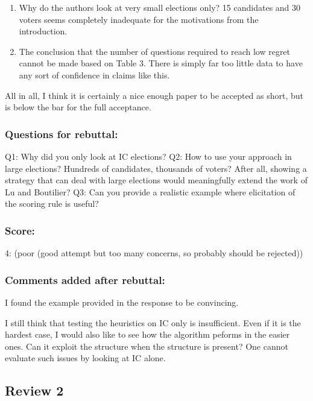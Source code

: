 \documentclass[version=3.21, pagesize, twoside=off, bibliography=totoc, DIV=calc, fontsize=12pt, a4paper]{scrartcl}
\begin{document}
\begin{enumerate}
\begin{enumerate}
		\item Why do the authors look at very small elections only? 15 candidates and 30 voters seems completely inadequate for the motivations from the introduction.
		
		\item The conclusion that the number of questions required to reach low regret cannot be made based on Table 3. There is simply far too little data to have any sort of confidence in claims like this.	
	\end{enumerate}

\end{enumerate}

All in all, I think it is certainly a nice enough paper to be accepted as short, but is below the bar for the full acceptance.

\subsubsection*{Questions for rebuttal:}
Q1: Why did you only look at IC elections?
\newline Q2: How to use your approach in large elections? Hundreds of candidates, thousands of voters? After all, showing a strategy that can deal with large elections would meaningfully extend the work of Lu and Boutilier?
\newline Q3: Can you provide a realistic example where elicitation of the scoring rule is useful?
\subsubsection*{Score:}	
4: (poor (good attempt but too many concerns, so probably should be rejected))

\subsubsection*{Comments added after rebuttal:}
I found the example provided in the response to be convincing.

I still think that testing the heuristics on IC only is insufficient. Even if it is the hardest case, I would also like to see how the algorithm peforms in the easier ones. Can it exploit the structure when the structure is present? One cannot evaluate such issues by looking at IC alone.

\subsection*{Review 2}
\end{document}
